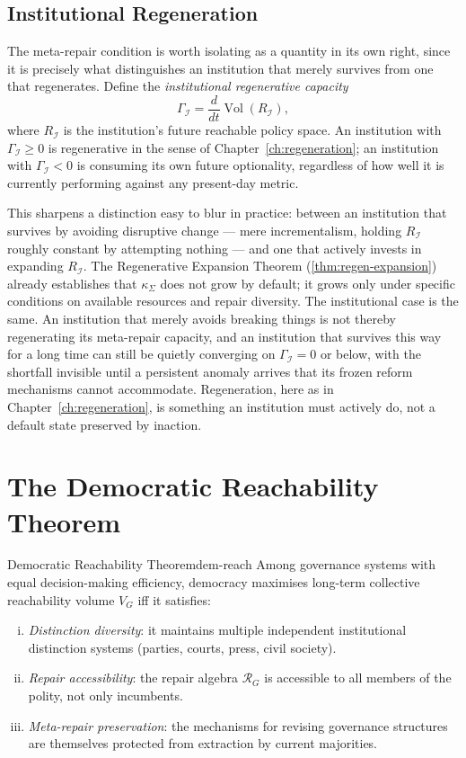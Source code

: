 \documentclass[12pt,twoside,openright]{book}
\newcommand{\Vol}{\operatorname{Vol}}
\begin{document}
\subsection{Institutional Regeneration}
\label{sec:ch28-inst-regen}

The meta-repair condition is worth isolating as a quantity in
its own right, since it is precisely what distinguishes an
institution that merely survives from one that regenerates.
Define the \emph{institutional regenerative capacity}
\[
  \Gamma_\mathcal{I}
  = \frac{d}{dt} \Vol(R_\mathcal{I}),
\]
where $R_\mathcal{I}$ is the institution's future reachable
policy space. An institution with $\Gamma_\mathcal{I} \ge 0$
is regenerative in the sense of Chapter~\ref{ch:regeneration};
an institution with $\Gamma_\mathcal{I} < 0$ is consuming its
own future optionality, regardless of how well it is
currently performing against any present-day metric.

This sharpens a distinction easy to blur in practice: between
an institution that survives by avoiding disruptive change ---
mere incrementalism, holding $R_\mathcal{I}$ roughly constant
by attempting nothing --- and one that actively invests in
expanding $R_\mathcal{I}$. The Regenerative Expansion Theorem
(\cref{thm:regen-expansion}) already establishes that
$\kappa_\Sigma$ does not grow by default; it grows only under
specific conditions on available resources and repair
diversity. The institutional case is the same. An institution
that merely avoids breaking things is not thereby regenerating
its meta-repair capacity, and an institution that survives
this way for a long time can still be quietly converging on
$\Gamma_\mathcal{I} = 0$ or below, with the shortfall invisible
until a persistent anomaly arrives that its frozen reform
mechanisms cannot accommodate. Regeneration, here as in
Chapter~\ref{ch:regeneration}, is something an institution
must actively do, not a default state preserved by inaction.

\section{The Democratic Reachability Theorem}

\begin{theorem}{Democratic Reachability Theorem}{dem-reach}
  Among governance systems with equal decision-making
  efficiency, democracy maximises long-term collective
  reachability volume $V_G$ iff it satisfies:
  \begin{enumerate}[(i)]
    \item \emph{Distinction diversity}: it maintains
          multiple independent institutional distinction
          systems (parties, courts, press, civil society).
    \item \emph{Repair accessibility}: the repair
          algebra $\mathcal{R}_G$ is accessible to
          all members of the polity, not only incumbents.
    \item \emph{Meta-repair preservation}: the
          mechanisms for revising governance structures
          are themselves protected from extraction
          by current majorities.
  \end{enumerate}
\end{theorem}
\end{document}
